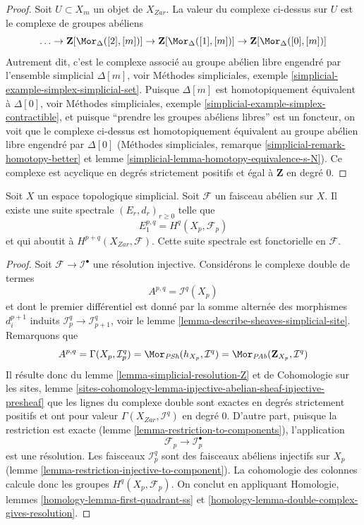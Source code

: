 \begin{proof}
Soit $U \subset X_m$ un objet de $X_{Zar}$. La valeur
du complexe ci-dessus sur $U$ est le complexe de groupes abéliens
$$
\ldots \to
\mathbf{Z}[\Mor_\Delta([2], [m])] \to
\mathbf{Z}[\Mor_\Delta([1], [m])] \to
\mathbf{Z}[\Mor_\Delta([0], [m])]
$$
Autrement dit, c'est le complexe associé au
groupe abélien libre engendré par l'ensemble simplicial $\Delta[m]$, voir
Méthodes simpliciales, exemple \ref{simplicial-example-simplex-simplicial-set}.
Puisque $\Delta[m]$ est homotopiquement équivalent à $\Delta[0]$, voir
Méthodes simpliciales, exemple \ref{simplicial-example-simplex-contractible},
et puisque ``prendre les groupes abéliens libres'' est un foncteur,
on voit que le complexe ci-dessus est homotopiquement équivalent au
groupe abélien libre engendré par $\Delta[0]$
(Méthodes simpliciales, remarque \ref{simplicial-remark-homotopy-better} et
lemme \ref{simplicial-lemma-homotopy-equivalence-s-N}).
Ce complexe est acyclique en degrés strictement positifs
et égal à $\mathbf{Z}$ en degré $0$.
\end{proof}

\begin{lemma}
\label{lemma-simplicial-sheaf-cohomology}
Soit $X$ un espace topologique simplicial. Soit $\mathcal{F}$ un faisceau abélien
sur $X$. Il existe une suite spectrale $(E_r, d_r)_{r \geq 0}$ telle que
$$
E_1^{p, q} = H^q(X_p, \mathcal{F}_p)
$$
et qui aboutit à $H^{p + q}(X_{Zar}, \mathcal{F})$.
Cette suite spectrale est fonctorielle en $\mathcal{F}$.
\end{lemma}

\begin{proof}
Soit $\mathcal{F} \to \mathcal{I}^\bullet$ une résolution injective.
Considérons le complexe double de termes
$$
A^{p, q} = \mathcal{I}^q(X_p)
$$
et dont le premier différentiel est donné par la somme alternée des morphismes
$d^{p + 1}_i$ induits $\mathcal{I}_p^q \to \mathcal{I}_{p + 1}^q$, voir
le lemme \ref{lemma-describe-sheaves-simplicial-site}. Remarquons que
$$
A^{p, q} = \Gamma(X_p, \mathcal{I}_p^q) =
\Mor_{\textit{PSh}}(h_{X_p}, \mathcal{I}^q) =
\Mor_{\textit{PAb}}(\mathbf{Z}_{X_p}, \mathcal{I}^q)
$$
Il résulte donc du lemme \ref{lemma-simplicial-resolution-Z} et de
Cohomologie sur les sites, lemme
\ref{sites-cohomology-lemma-injective-abelian-sheaf-injective-presheaf}
que les lignes du complexe double sont exactes en degrés strictement positifs et
ont pour valeur $\Gamma(X_{Zar}, \mathcal{I}^q)$ en degré $0$.
D'autre part, puisque la restriction est exacte
(lemme \ref{lemma-restriction-to-components}),
l'application
$$
\mathcal{F}_p \to \mathcal{I}_p^\bullet
$$
est une résolution. Les faisceaux $\mathcal{I}_p^q$ sont des faisceaux
abéliens injectifs sur $X_p$
(lemme \ref{lemma-restriction-injective-to-component}).
La cohomologie des colonnes calcule donc les groupes
$H^q(X_p, \mathcal{F}_p)$. On conclut en appliquant
Homologie, lemmes \ref{homology-lemma-first-quadrant-ss} et
\ref{homology-lemma-double-complex-gives-resolution}.
\end{proof}

